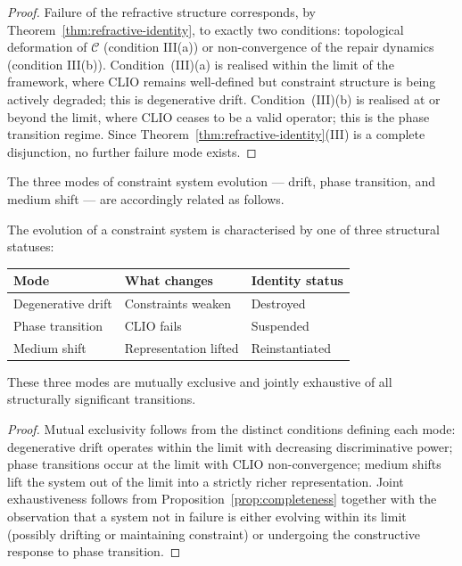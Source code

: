 \documentclass[11pt,openany]{book}
\begin{document}
\begin{proof}
Failure of the refractive structure corresponds, by
Theorem~\ref{thm:refractive-identity}, to exactly two
conditions: topological deformation of $\mathcal{C}$
(condition III(a)) or non-convergence of the repair
dynamics (condition III(b)).  Condition~(III)(a) is
realised within the limit of the framework, where CLIO
remains well-defined but constraint structure is being
actively degraded; this is degenerative drift.
Condition~(III)(b) is realised at or beyond the limit,
where CLIO ceases to be a valid operator; this is the
phase transition regime.  Since Theorem~\ref{thm:refractive-identity}(III)
is a complete disjunction, no further failure mode exists.
\end{proof}

The three modes of constraint system evolution --- drift,
phase transition, and medium shift --- are accordingly
related as follows.

\begin{proposition}
\label{prop:classification}
The evolution of a constraint system is characterised by
one of three structural statuses:

\medskip
\begin{center}
\begin{tabular}{lll}
\toprule
\textbf{Mode} & \textbf{What changes} & \textbf{Identity status} \\
\midrule
Degenerative drift    & Constraints weaken       & Destroyed       \\
Phase transition      & CLIO fails               & Suspended       \\
Medium shift          & Representation lifted    & Reinstantiated  \\
\bottomrule
\end{tabular}
\end{center}
\medskip

These three modes are mutually exclusive and jointly
exhaustive of all structurally significant transitions.
\end{proposition}

\begin{proof}
Mutual exclusivity follows from the distinct conditions
defining each mode: degenerative drift operates within the
limit with decreasing discriminative power; phase
transitions occur at the limit with CLIO non-convergence;
medium shifts lift the system out of the limit into a
strictly richer representation.  Joint exhaustiveness
follows from Proposition~\ref{prop:completeness} together
with the observation that a system not in failure is either
evolving within its limit (possibly drifting or maintaining
constraint) or undergoing the constructive response to
phase transition.
\end{proof}
\end{document}
